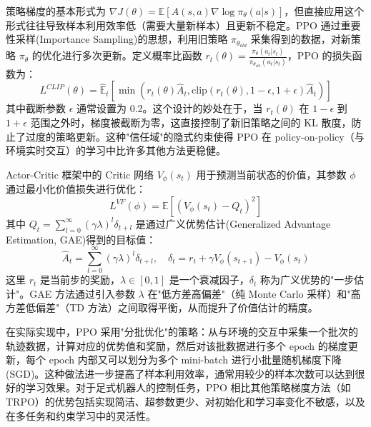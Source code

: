 策略梯度的基本形式为 $\nabla J(\theta) = \mathbb{E}[A(s,a) \nabla \log \pi_\theta(a|s)]$，但直接应用这个形式往往导致样本利用效率低（需要大量新样本）且更新不稳定。PPO 通过重要性采样(Importance Sampling)的思想，利用旧策略 $\pi_{\theta_{old}}$ 采集得到的数据，对新策略 $\pi_\theta$ 的优化进行多次更新。定义概率比函数 $r_{t}(\theta)=\frac{\pi_{\theta}(a_{t}|s_{t})}{\pi_{\theta_{old}}(a_{t}|s_{t})}$，PPO 的损失函数为：
\begin{equation}
L^{CLIP}(\theta)=\hat{\mathbb{E}}_{t}\left[\min\left(r_{t}(\theta)\hat{A}_{t}, \text{clip}(r_{t}(\theta), 1-\epsilon, 1+\epsilon)\hat{A}_{t}\right)\right]
\label{eq:ppo_loss}
\end{equation}
其中截断参数 $\epsilon$ 通常设置为 0.2。这个设计的妙处在于，当 $r_t(\theta)$ 在 $1 - \epsilon$ 到 $1 + \epsilon$ 范围之外时，梯度被截断为零，这直接控制了新旧策略之间的 KL 散度，防止了过度的策略更新。这种"信任域"的隐式约束使得 PPO 在 policy-on-policy（与环境实时交互）的学习中比许多其他方法更稳健。

Actor-Critic 框架中的 Critic 网络 $V_{\phi}(s_{t})$ 用于预测当前状态的价值，其参数 $\phi$ 通过最小化价值损失进行优化：
\begin{equation}
L^{VF}(\phi) = \mathbb{E}[(V_\phi(s_t) - Q_t)^2]
\label{eq:value_loss}
\end{equation}
其中 $Q_t = \sum_{l=0}^{\infty}(\gamma\lambda)^{l}\delta_{t+l}$ 是通过广义优势估计(Generalized Advantage Estimation, GAE)\cite{Schulman2015GAE}得到的目标值：
\begin{equation}
\hat{A}_{t}=\sum_{l=0}^{\infty}(\gamma\lambda)^{l}\delta_{t+l}, \quad \delta_{t}=r_{t}+\gamma V_{\phi}(s_{t+1})-V_{\phi}(s_{t})
\label{eq:gae}
\end{equation}
这里 $r_t$ 是当前步的奖励，$\lambda \in [0, 1]$ 是一个衰减因子，$\delta_t$ 称为广义优势的"一步估计"。GAE 方法通过引入参数 $\lambda$ 在"低方差高偏差"（纯 Monte Carlo 采样）和"高方差低偏差"（TD 方法）之间取得平衡，从而提升了价值估计的精度。

在实际实现中，PPO 采用"分批优化"的策略：从与环境的交互中采集一个批次的轨迹数据，计算对应的优势值和奖励，然后对该批数据进行多个 epoch 的梯度更新，每个 epoch 内部又可以划分为多个 mini-batch 进行小批量随机梯度下降(SGD)。这种做法进一步提高了样本利用效率，通常用较少的样本次数可以达到很好的学习效果。对于足式机器人的控制任务，PPO 相比其他策略梯度方法（如 TRPO）的优势包括实现简洁、超参数更少、对初始化和学习率变化不敏感，以及在多任务和约束学习中的灵活性。